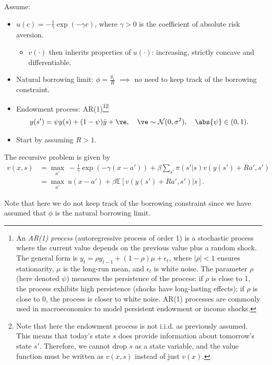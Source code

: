     Assume:
    \begin{itemize}
        \item $u(c) = -\frac{1}{\gamma}\exp(-\gamma c)$, where $\gamma > 0$ is the coefficient of absolute risk aversion.
        \begin{itemize}
            \item $v(\cdot)$ then inherits properties of $u(\cdot)$: increasing, strictly concave and differentiable.
        \end{itemize}
        \item Natural borrowing limit: $\phi = \frac{y_1}{R}$ $\implies$ no need to keep track of the borrowing constraint.
        \item Endowment process: AR(1)\footnote{
            An \textit{AR(1) process} (autoregressive process of order 1) is a stochastic process where the current value depends on the previous value plus a random shock. The general form is $y_t = \rho y_{t-1} + (1-\rho)\mu + \epsilon_t$, where $|\rho| < 1$ ensures stationarity, $\mu$ is the long-run mean, and $\epsilon_t$ is white noise. The parameter $\rho$ (here denoted $\psi$) measures the persistence of the process: if $\rho$ is close to 1, the process exhibits high persistence (shocks have long-lasting effects); if $\rho$ is close to 0, the process is closer to white noise. AR(1) processes are commonly used in macroeconomics to model persistent endowment or income shocks.
        }\footnote{
            Note that here the endowment process is not i.i.d. as previously assumed. This means that today's state $s$ does provide information about tomorrow's state $s'$. Therefore, we cannot drop $s$ as a state variable, and the value function must be written as $v(x,s)$ instead of just $v(x)$.}
        \[
        y(s') = \psi y(s)+(1-\psi)\bar y+\ve, \quad \ve \sim \mathcal N(0,\sigma^2), \quad \abs{\psi}\in (0,1).
        \]
        \item Start by assuming $R>1$. 
    \end{itemize}
    The recursive problem is given by
\[
    \begin{aligned}
        v(x,s) & = \max_{a'} \ -\frac{1}{\gamma}\exp(-\gamma(x-a')) + \beta \sum_{s'}\pi(s'|s) v(y(s')+Ra',s')\\
        & = \max_{a'} \ u(x-a')+\beta \mathbb E[v(y(s')+Ra',s')|s].
    \end{aligned}
\]

Note that here we do not keep track of the borrowing constraint since we have assumed that $\phi$ is the natural borrowing limit. 

